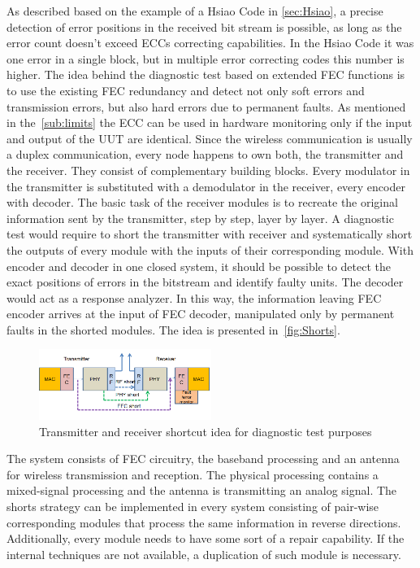 As described based on the example of a Hsiao Code in \autoref{sec:Hsiao}, a precise detection of error positions in the received bit stream is possible, as long as the error count doesn't exceed ECCs correcting capabilities. In the Hsiao Code it was one error in a single block, but in multiple error correcting codes this number is higher. The idea behind the diagnostic test based on extended FEC functions is to use the existing FEC redundancy and detect not only soft errors and transmission errors, but also hard errors due to permanent faults. As mentioned in the~\autoref{sub:limits} the ECC can be used in hardware monitoring only if the input and output of the UUT are identical. Since the wireless communication is usually a duplex communication, every node happens to own both, the transmitter and the receiver. They consist of complementary building blocks. Every modulator in the transmitter is substituted with a demodulator in the receiver, every encoder with decoder. The basic task of the receiver modules is to recreate the original information sent by the transmitter, step by step, layer by layer. A diagnostic test would require to short the transmitter with receiver and systematically short the outputs of every module with the inputs of their corresponding module. With encoder and decoder in one closed system, it should be possible to detect the exact positions of errors in the bitstream and identify faulty units. The decoder would act as a response analyzer. In this way, the information leaving FEC encoder arrives at the input of FEC decoder, manipulated only by permanent faults in the shorted modules. The idea is presented in~\autoref{fig:Shorts}. 

\begin{figure}[h]
\centering
\includegraphics[width=0.5\textwidth]{figures/Shorts.png}
\caption{Transmitter and receiver shortcut idea for diagnostic test purposes}
\label{fig:Shorts}
\end{figure}

The system consists of FEC circuitry, the baseband processing and an antenna for wireless transmission and reception. The physical processing contains a mixed-signal processing and the antenna is transmitting an analog signal. The shorts strategy can be implemented in every system consisting of pair-wise corresponding modules that process the same information in reverse directions. Additionally, every module needs to have some sort of a repair capability. If the internal techniques are not available, a duplication of such module is necessary.

